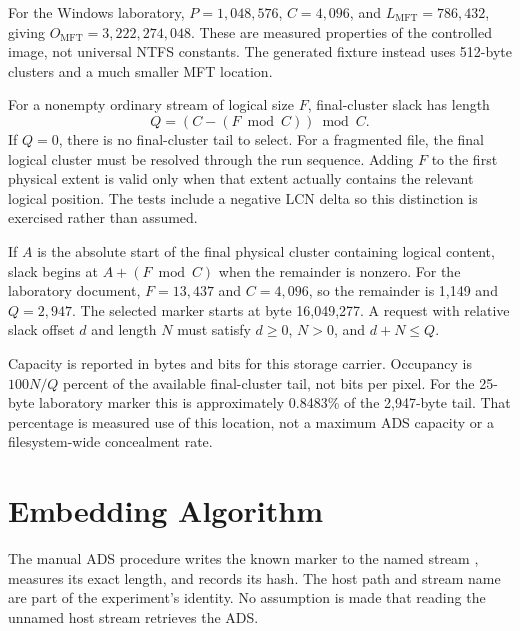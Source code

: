 For the Windows laboratory, $P=1{,}048{,}576$, $C=4{,}096$, and
$L_{\mathrm{MFT}}=786{,}432$, giving
$O_{\mathrm{MFT}}=3{,}222{,}274{,}048$. These are measured properties of the
controlled image, not universal NTFS constants. The generated fixture instead
uses 512-byte clusters and a much smaller MFT location.

For a nonempty ordinary stream of logical size $F$, final-cluster slack has
length
\begin{equation}
Q = (C - (F \bmod C)) \bmod C.
\end{equation}
If $Q=0$, there is no final-cluster tail to select. For a fragmented file,
the final logical cluster must be resolved through the run sequence. Adding
$F$ to the first physical extent is valid only when that extent actually
contains the relevant logical position. The tests include a negative LCN
delta so this distinction is exercised rather than assumed.

If $A$ is the absolute start of the final physical cluster containing
logical content, slack begins at $A+(F\bmod C)$ when the remainder is nonzero.
For the laboratory document, $F=13{,}437$ and $C=4{,}096$, so the remainder
is 1,149 and $Q=2{,}947$. The selected marker starts at byte 16,049,277.
A request with relative slack offset $d$ and length $N$ must satisfy
$d\geq0$, $N>0$, and $d+N\leq Q$.

Capacity is reported in bytes and bits for this storage carrier. Occupancy
is $100N/Q$ percent of the available final-cluster tail, not bits per pixel.
For the 25-byte laboratory marker this is approximately 0.8483\% of the
2,947-byte tail. That percentage is measured use of this location, not a
maximum ADS capacity or a filesystem-wide concealment rate.

\section{Embedding Algorithm}
The manual ADS procedure writes the known marker to the named stream
, measures its exact length, and records
its hash. The host path and stream name are part of the experiment's identity.
No assumption is made that reading the unnamed host stream retrieves the ADS.

